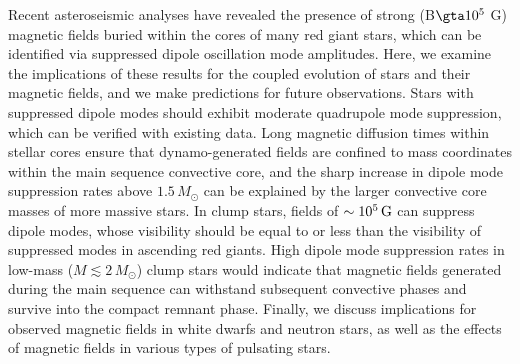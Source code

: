 Recent asteroseismic analyses have revealed the presence of strong (B$\gta 10^5$ G) magnetic fields buried within the cores of many red giant stars, which can be identified via suppressed dipole oscillation mode amplitudes. Here, we examine the implications of these results for the coupled evolution of stars and their magnetic fields, and we make predictions for future observations. Stars with suppressed dipole modes should exhibit moderate quadrupole mode suppression, which can be verified with existing data. Long magnetic diffusion times within stellar cores ensure that dynamo-generated fields are confined to mass coordinates within the main sequence convective core, and the sharp increase in dipole mode suppression rates above $1.5 \, M_\odot$ can be explained by the larger convective core masses of more massive stars.
In clump stars, fields of $\sim 10^5 \, {\rm G}$ can suppress dipole modes, whose visibility should be equal to or less than the visibility of suppressed modes in ascending red giants. High dipole mode suppression rates in low-mass ($M \lesssim 2 \, M_\odot$) clump stars would indicate that magnetic fields generated during the main sequence can withstand subsequent convective phases and survive into the compact remnant phase. Finally, we discuss implications for observed magnetic fields in white dwarfs and neutron stars, as well as the effects of magnetic fields in various types of pulsating stars.
  
  
  
  
  
  
  